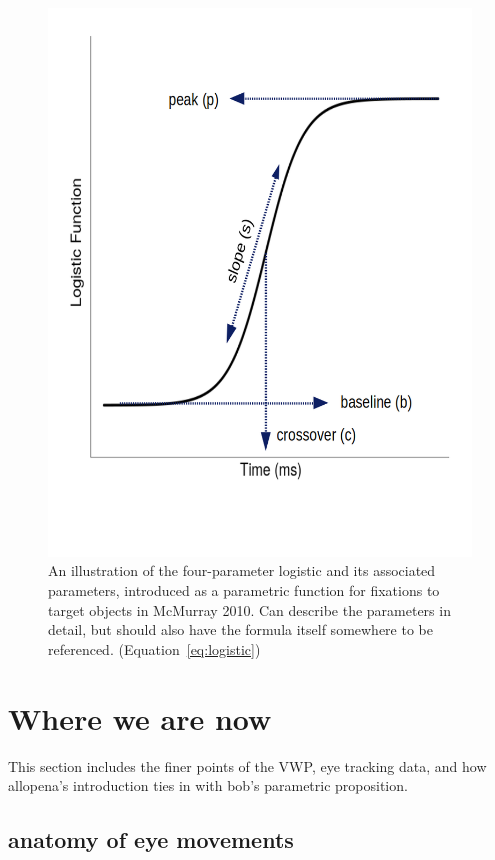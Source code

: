 \documentclass{article}
\begin{document}
\begin{figure}[h]
\centering
\includegraphics[scale=0.4]{logistic_label.png}
\caption{An illustration of the four-parameter logistic and its associated parameters, introduced as a parametric function for fixations to target objects in McMurray 2010. Can describe the parameters in detail, but should also have the formula itself somewhere to be referenced. (Equation~\ref{eq:logistic})}
\label{fig:logistic_definition}
\end{figure}



\section{Where we are now}

This section includes the finer points of the VWP, eye tracking data, and how allopena's introduction ties in with bob's parametric proposition.

\subsection{anatomy of eye  movements}
\end{document}
